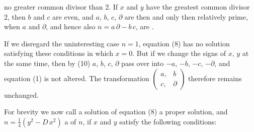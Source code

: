no greater common divisor than 2. If $x$ and $y$ have the greatest
common divisor 2, then $b$ and $c$ are even, and $a$, $b$, $c$,
$\partial$ are then and only then relatively prime, when $a$ and
$\partial$, and hence also $n = a\,\partial - b\,c$, are .

If we disregard the uninteresting case $n=1$, equation (8) has no
solution satisfying these conditions in which $x=0$. But if we change
the signs of $x$, $y$ at the same time, then by (10) $a$, $b$, $c$, %
$\partial$ pass over into $-a$, $-b$, $-c$, $-\partial$, and equation
(1) is not altered. The transformation
$\begin{pmatrix} a, & b\\ c, & \partial \end{pmatrix}$ therefore
remains unchanged.

For brevity we now call a solution of equation (8) a
proper solution, and $n = \frac{1}{4}(y^2-D\,x^2)$ a
 of $n$, if $x$ and $y$ satisfy the
following conditions:




